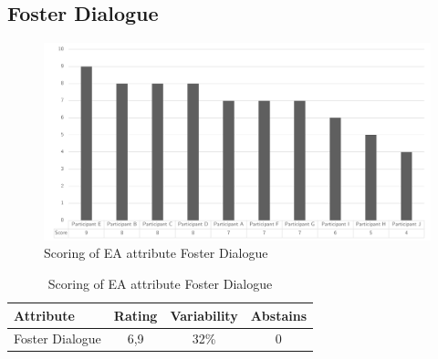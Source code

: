 \subsection{Foster Dialogue}
\begin{figure}[h!]
	\centering
	\includegraphics[width=0.9\linewidth]{images/scoreeafosterdialogue}
	\caption[Scoring of EA attribute Foster Dialogue]{Scoring of EA attribute Foster Dialogue}
	\label{fig:appscoringeafosterdialogue}
\end{figure}
\begin{table}[h!]
	\centering
	\begin{tabular}{p{}ccc}
		\toprule
		\textbf{Attribute} & \textbf{Rating} & \textbf{Variability} & \textbf{Abstains} \\
		\midrule
		Foster Dialogue & 6,9 & 32\% & 0 \\%
		\bottomrule
	\end{tabular}%
	\caption[Scoring of EA attribute Foster Dialogue]{Scoring of EA attribute Foster Dialogue}
	\label{tab:appscoringeafosterdialogue}%
\end{table}%
\newpage
